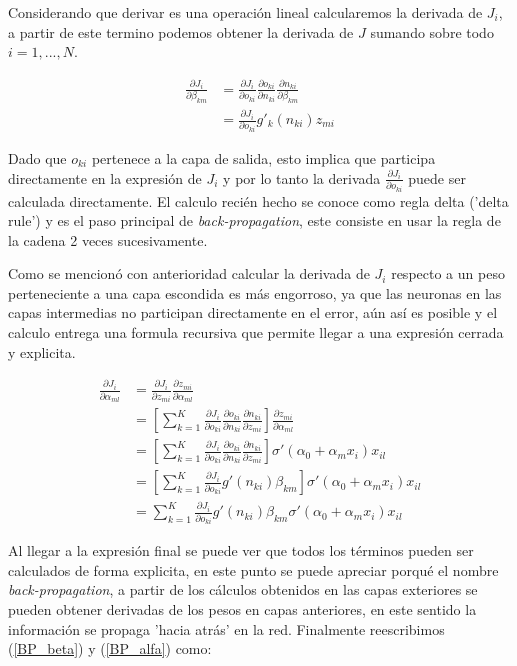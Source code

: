 Considerando que derivar es una operación lineal calcularemos la derivada de $J_i$, a partir de este termino podemos obtener la derivada de $J$ sumando sobre todo $i=1,...,N$.

\begin{align}
\frac{\partial J_i}{\partial \beta_{km}}&=
\frac{\partial J_i}{\partial o_{ki}}
\frac{\partial o_{ki}}{\partial n_{ki}}
\frac{\partial n_{ki}}{\partial \beta_{km}}\\
&= \frac{\partial J_i}{\partial o_{ki}}
g'_k(n_{ki})z_{mi}
\label{BP_beta}
\end{align}

Dado que $o_{ki}$ pertenece a la capa de salida, esto implica que participa directamente en la expresión de $J_i$ y por lo tanto la derivada $\frac{\partial J_i}{\partial o_{ki}}$ puede ser calculada directamente. El calculo recién hecho se conoce como regla delta ('delta rule') y es el paso principal de \textit{back-propagation}, este consiste en usar la regla de la cadena 2 veces sucesivamente.

Como se mencionó con anterioridad calcular la derivada de $J_i$ respecto a un peso perteneciente a una capa escondida es más engorroso, ya que las neuronas en las capas intermedias no participan directamente en el error, aún así es posible y el calculo entrega una formula recursiva que permite llegar a una expresión cerrada y explicita.

\begin{align}
\frac{\partial J_i}{\partial \alpha_{ml}}&=
\frac{\partial J_i}{\partial z_{mi}}
\frac{\partial z_{mi}}{\partial \alpha_{ml}}\\
&= \left [ \sum_{k=1}^K
\frac{\partial J_i}{\partial o_{ki}}
\frac{\partial o_{ki}}{\partial n_{ki}}
\frac{\partial n_{ki}}{\partial z_{mi}}
\right ]
\frac{\partial z_{mi}}{\partial \alpha_{ml}}\\
&= \left [ \sum_{k=1}^K
\frac{\partial J_i}{\partial o_{ki}}
\frac{\partial o_{ki}}{\partial n_{ki}}
\frac{\partial n_{ki}}{\partial z_{mi}}
\right ]\sigma'(\alpha_0+\alpha_mx_i)x_{il}\\
&= \left [ \sum_{k=1}^K
\frac{\partial J_i}{\partial o_{ki}}
g'(n_{ki})
\beta_{km}
\right ]\sigma'(\alpha_0+\alpha_mx_i)x_{il}\\
&=  \sum_{k=1}^K
\frac{\partial J_i}{\partial o_{ki}}
g'(n_{ki})
\beta_{km}
\sigma'(\alpha_0+\alpha_mx_i)x_{il}
\label{BP_alfa}
\end{align}

Al llegar a la expresión final se puede ver que todos los términos pueden ser calculados de forma explicita, en este punto se puede apreciar porqué el nombre \textit{back-propagation}, a partir de los cálculos obtenidos en las capas exteriores se pueden obtener derivadas de los pesos en capas anteriores, en este sentido la información se propaga 'hacia atrás' en la red. Finalmente reescribimos (\ref{BP_beta}) y (\ref{BP_alfa}) como:

